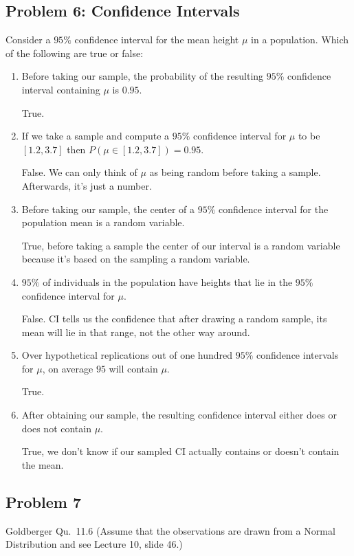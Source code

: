 \documentclass{article}
\newcommand{\1}{\mathbf{1}}
\begin{document}
\subsection*{Problem 6: Confidence Intervals}
Consider a $95\%$ confidence interval for the mean height $\mu$ in a population. Which of the following are true or false: 
\begin{enumerate}
    \item Before taking our sample,  the probability of the resulting $95\%$ confidence interval containing $\mu$ is $0.95$.
    
    True. 
    
    \item If we take a sample and compute a $95\%$ confidence interval for $\mu$ to be $[1.2,3.7]$ then $P(\mu \in [1.2,3.7]) = 0.95$.
    
    False. We can only think of $\mu$ as being random before taking a sample. Afterwards, it's just a number.
    
    \item Before taking our sample, the center of a $95\%$ confidence interval for the population mean is a random variable.
    
    True, before taking a sample the center of our interval is a random variable because it's based on the sampling a random variable.
    
    \item $95\%$ of individuals in the population have heights that lie in the $95\%$ confidence interval for $\mu$. 
    
    False. CI tells us the confidence that after drawing a random sample, its mean will lie in that range, not the other way around.
    
    \item Over hypothetical replications out of one hundred $95\%$ confidence intervals for $\mu$, on average $95$ will contain $\mu$.
    
    True.
    
    \item After obtaining our sample, the resulting confidence interval either does or does not contain $\mu$.
    
    True, we don't know if our sampled CI actually contains or doesn't contain the mean. 
\end{enumerate}




\newpage
\subsection*{Problem 7}
Goldberger Qu.~11.6 (Assume that the observations are drawn from a Normal Distribution and see Lecture 10, slide 46.)
\end{document}
